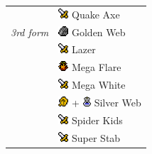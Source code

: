 \begin{longtable}{ l p{9cm} }
	& \includegraphics[height=1em,keepaspectratio]{./resources/effects/damage} Quake Axe \\
	\textit{3rd form} & \includegraphics[height=1em,keepaspectratio]{./resources/effects/petrify} Golden Web \\
	& \includegraphics[height=1em,keepaspectratio]{./resources/effects/damage} Lazer \\
	& \includegraphics[height=1em,keepaspectratio]{./resources/effects/fire} Mega Flare \\
	& \includegraphics[height=1em,keepaspectratio]{./resources/effects/damage} Mega White \\
	& \includegraphics[height=1em,keepaspectratio]{./resources/effects/confusion} + \includegraphics[height=1em,keepaspectratio]{./resources/effects/poison} Silver Web \\
	& \includegraphics[height=1em,keepaspectratio]{./resources/effects/damage} Spider Kids \\
	& \includegraphics[height=1em,keepaspectratio]{./resources/effects/damage} Super Stab
\end{longtable}
